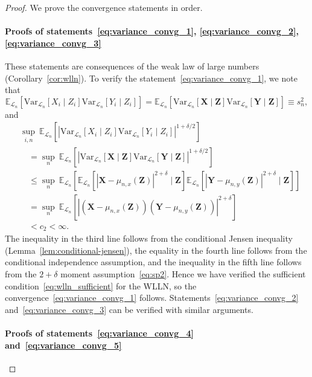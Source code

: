 \documentclass[aos]{imsart}
\theoremstyle{plain}
\theoremstyle{remark}
\newcommand{\E}{\mathbb E}								%
\newcommand{\V}{\mathrm{Var}}							%
\newcommand{\prx}{\bm X}								%
\newcommand{\srx}{X}									%
\newcommand{\prz}{\bm Z}								%
\newcommand{\srz}{Z}									%
\newcommand{\pry}{{\bm Y}}								%
\newcommand{\sry}{Y}									%
\newcommand{\law}{\mathcal L}							%
\begin{document}
\begin{proof}
	
	We prove the convergence statements in order.
	
	\paragraph*{Proofs of statements~\eqref{eq:variance_convg_1}, \eqref{eq:variance_convg_2}, \eqref{eq:variance_convg_3}}
	
	These statements are consequences of the weak law of large numbers (Corollary~\ref{cor:wlln}). To verify the statement~\eqref{eq:variance_convg_1}, we note that
	\begin{equation*}
		\E_{\law_n}[\V_{\law_n}[\srx_i\mid \srz_i]\V_{\law_n}[\sry_i \mid \srz_i]] = \E_{\law_n}[\V_{\law_n}[\prx\mid \prz]\V_{\law_n}[\pry \mid \prz]] \equiv s^2_n, 
	\end{equation*}
	and
	\begin{equation}
		\begin{split}
			&\sup_{i,n} \ \E_{\law_n}[|\V_{\law_n}[\srx_i\mid \srz_i]\V_{\law_n}[\sry_i \mid \srz_i]|^{1+\delta/2}] \\
			&\quad= \sup_n\ \E_{\law_n}[|\V_{\law_n}[\prx\mid \prz]\V_{\law_n}[\pry \mid \prz]|^{1+\delta/2}] \\
			&\quad\leq \sup_n\ \E_{\law_n}[\E_{\law_n}[|\prx - \mu_{n,x}(\prz)|^{2+\delta} \mid \prz]\E_{\law_n}[|\pry - \mu_{n,y}(\prz)|^{2+\delta} \mid \prz]] \\
			&\quad= \sup_n\ \E_{\law_n}[|(\prx - \mu_{n,x}(\prz))(\pry - \mu_{n,y}(\prz))|^{2 + \delta}] \\
			&\quad< c_2 < \infty.
		\end{split}
		\label{eq:variance-bound-derivation}
	\end{equation}
	The inequality in the third line follows from the conditional Jensen inequality (Lemma~\ref{lem:conditional-jensen}), the equality in the fourth line follows from the conditional independence assumption, and the inequality in the fifth line follows from the $2+\delta$ moment assumption~\eqref{eq:sp2}. Hence we have verified the sufficient condition~\eqref{eq:wlln_sufficient} for the WLLN, so the convergence~\eqref{eq:variance_convg_1} follows. Statements~\eqref{eq:variance_convg_2} and~\eqref{eq:variance_convg_3} can be verified with similar arguments.
	
	\paragraph*{Proofs of statements~\eqref{eq:variance_convg_4} and~\eqref{eq:variance_convg_5}} 
	

\end{proof}
\end{document}

